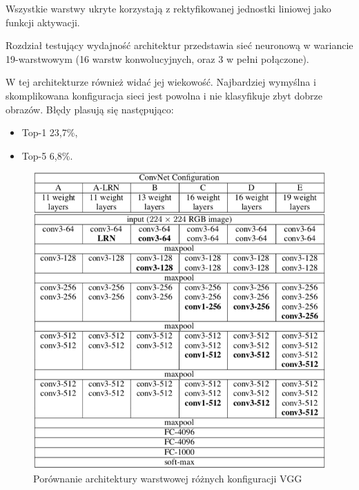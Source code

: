 \documentclass[12pt,a4paper,twoside,titlepage,openright]{book}
\begin{document}
\begin{itemize}
Wszystkie warstwy ukryte korzystają z rektyfikowanej jednostki liniowej jako funkcji aktywacji.

Rozdział testujący wydajność architektur przedstawia sieć neuronową w wariancie 19-warstwowym (16 warstw konwolucyjnych, oraz 3 w pełni połączone).

W tej architekturze również widać jej wiekowość. Najbardziej wymyślna i skomplikowana konfiguracja sieci jest powolna i nie klasyfikuje zbyt dobrze obrazów. Błędy plasują się następująco:
\begin{itemize}
\item Top-1 23,7\%,
\item Top-5 6,8\%. \cite{DBLP:journals/corr/SimonyanZ14a}
\end{itemize}

\begin{figure}[ht]
	\centering
			\includegraphics[resolution=100, scale=0.8]{vggArchComparison.png}
		\caption{Porównanie architektury warstwowej różnych konfiguracji VGG}
\end{figure}



\end{itemize}
\end{document}
